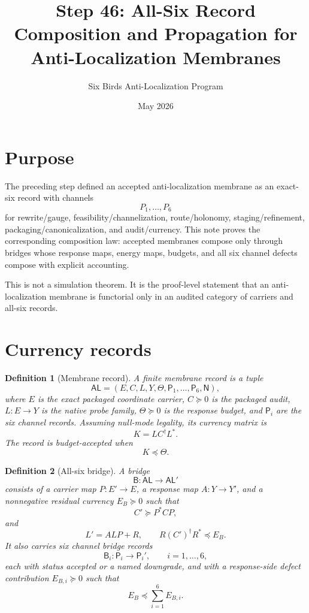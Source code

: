 \documentclass[11pt]{article}
\title{Step 46: All-Six Record Composition and Propagation for Anti-Localization Membranes}
\author{Six Birds Anti-Localization Program}
\date{May 2026}
\newtheorem{definition}{Definition}
\begin{document}
\maketitle

\section{Purpose}

The preceding step defined an accepted anti-localization membrane as an exact-six record with channels
\[
P_1,\ldots,P_6
\]
for rewrite/gauge, feasibility/channelization, route/holonomy, staging/refinement, packaging/canonicalization, and audit/currency.  This note proves the corresponding composition law: accepted membranes compose only through bridges whose response maps, energy maps, budgets, and all six channel defects compose with explicit accounting.

This is not a simulation theorem. It is the proof-level statement that an anti-localization membrane is functorial only in an audited category of carriers and all-six records.

\section{Currency records}

\begin{definition}[Membrane record]
A finite membrane record is a tuple
\[
\mathsf{AL}=(E,C,L,Y,\Theta,\mathsf P_1,\ldots,\mathsf P_6,\mathsf N),
\]
where $E$ is the exact packaged coordinate carrier, $C\succeq0$ is the packaged audit, $L:E\to Y$ is the native probe family, $\Theta\succeq0$ is the response budget, and $\mathsf P_i$ are the six channel records.  Assuming null-mode legality, its currency matrix is
\[
K=L C^\dagger L^*.
\]
The record is budget-accepted when
\[
K\preceq \Theta.
\]
\end{definition}

\begin{definition}[All-six bridge]
A bridge
\[
\mathsf B: \mathsf{AL}\to\mathsf{AL}'
\]
consists of a carrier map $P:E'\to E$, a response map $A:Y\to Y'$, and a nonnegative residual currency $E_B\succeq0$ such that
\[
C'\succeq P^*CP,
\]
and
\[
L'=ALP+R,
\qquad
R(C')^\dagger R^*\preceq E_B.
\]
It also carries six channel bridge records
\[
\mathsf B_i:\mathsf P_i\to\mathsf P_i',\qquad i=1,\dots,6,
\]
each with status accepted or a named downgrade, and with a response-side defect contribution $E_{B,i}\succeq0$ such that
\[
E_B\preceq \sum_{i=1}^6 E_{B,i}.
\]
\end{definition}
\end{document}
